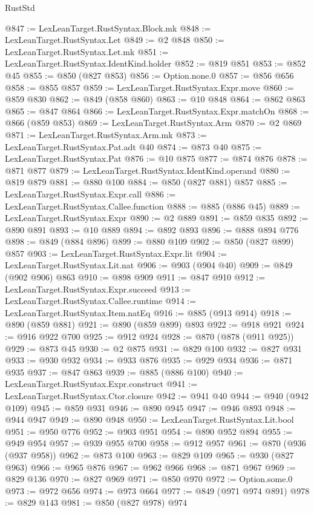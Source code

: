 \begin{lexlean}{RustStd}
\begin{coremodule}
@847 := LexLeanTarget.RustSyntax.Block.mk
@848 := LexLeanTarget.RustSyntax.Let
@849 := @2 @848
@850 := LexLeanTarget.RustSyntax.Let.mk
@851 := LexLeanTarget.RustSyntax.IdentKind.holder
@852 := @819 @851
@853 := @852 @45
@855 := @850 (@827 @853)
@856 := Option.none.{0}
@857 := @856 @656
@858 := @855 @857
@859 := LexLeanTarget.RustSyntax.Expr.move
@860 := @859 @830
@862 := @849 (@858 @860)
@863 := @10 @848
@864 := @862 @863
@865 := @847 @864
@866 := LexLeanTarget.RustSyntax.Expr.matchOn
@868 := @866 (@859 @853)
@869 := LexLeanTarget.RustSyntax.Arm
@870 := @2 @869
@871 := LexLeanTarget.RustSyntax.Arm.mk
@873 := LexLeanTarget.RustSyntax.Pat.adt @40
@874 := @873 @40
@875 := LexLeanTarget.RustSyntax.Pat
@876 := @10 @875
@877 := @874 @876
@878 := @871 @877
@879 := LexLeanTarget.RustSyntax.IdentKind.operand
@880 := @819 @879
@881 := @880 @100
@884 := @850 (@827 @881) @857
@885 := LexLeanTarget.RustSyntax.Expr.call
@886 := LexLeanTarget.RustSyntax.Callee.function
@888 := @885 (@886 @45)
@889 := LexLeanTarget.RustSyntax.Expr
@890 := @2 @889
@891 := @859 @835
@892 := @890 @891
@893 := @10 @889
@894 := @892 @893
@896 := @888 @894 @776
@898 := @849 (@884 @896)
@899 := @880 @109
@902 := @850 (@827 @899) @857
@903 := LexLeanTarget.RustSyntax.Expr.lit
@904 := LexLeanTarget.RustSyntax.Lit.nat
@906 := @903 (@904 @40)
@909 := @849 (@902 @906) @863
@910 := @898 @909
@911 := @847 @910
@912 := LexLeanTarget.RustSyntax.Expr.succeed
@913 := LexLeanTarget.RustSyntax.Callee.runtime
@914 := LexLeanTarget.RustSyntax.Item.natEq
@916 := @885 (@913 @914)
@918 := @890 (@859 @881)
@921 := @890 (@859 @899) @893
@922 := @918 @921
@924 := @916 @922 @700
@925 := @912 @924
@928 := @870 (@878 (@911 @925))
@929 := @873 @45
@930 := @2 @875
@931 := @829 @100
@932 := @827 @931
@933 := @930 @932
@934 := @933 @876
@935 := @929 @934
@936 := @871 @935
@937 := @847 @863
@939 := @885 (@886 @100)
@940 := LexLeanTarget.RustSyntax.Expr.construct
@941 := LexLeanTarget.RustSyntax.Ctor.closure
@942 := @941 @40
@944 := @940 (@942 @109)
@945 := @859 @931
@946 := @890 @945
@947 := @946 @893
@948 := @944 @947
@949 := @890 @948
@950 := LexLeanTarget.RustSyntax.Lit.bool
@951 := @950 @776
@952 := @903 @951
@954 := @890 @952 @894
@955 := @949 @954
@957 := @939 @955 @700
@958 := @912 @957
@961 := @870 (@936 (@937 @958))
@962 := @873 @100
@963 := @829 @109
@965 := @930 (@827 @963)
@966 := @965 @876
@967 := @962 @966
@968 := @871 @967
@969 := @829 @136
@970 := @827 @969
@971 := @850 @970
@972 := Option.some.{0}
@973 := @972 @656
@974 := @973 @664
@977 := @849 (@971 @974 @891)
@978 := @829 @143
@981 := @850 (@827 @978) @974

\end{coremodule}
\end{lexlean}
